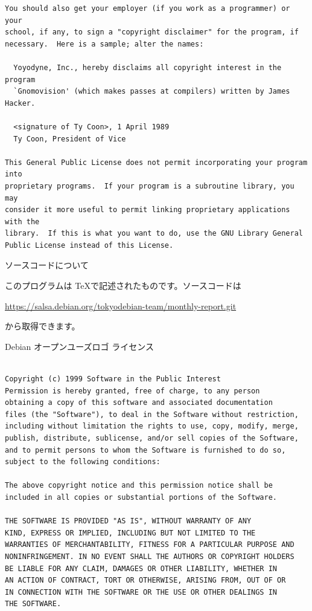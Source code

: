 \documentclass[mingoth,a4paper]{jsarticle}
\begin{document}
\begin{multicols}{2}
\begin{fontsize}{6}{6}
\begin{verbatim}
You should also get your employer (if you work as a programmer) or your
school, if any, to sign a "copyright disclaimer" for the program, if
necessary.  Here is a sample; alter the names:

  Yoyodyne, Inc., hereby disclaims all copyright interest in the program
  `Gnomovision' (which makes passes at compilers) written by James Hacker.

  <signature of Ty Coon>, 1 April 1989
  Ty Coon, President of Vice

This General Public License does not permit incorporating your program into
proprietary programs.  If your program is a subroutine library, you may
consider it more useful to permit linking proprietary applications with the
library.  If this is what you want to do, use the GNU Library General
Public License instead of this License.
 \end{verbatim}
 \end{fontsize}
\end{multicols}

\begin{center}
ソースコードについて
\end{center}

このプログラムは \TeX で記述されたものです。ソースコードは
\begin{center}
  \url{https://salsa.debian.org/tokyodebian-team/monthly-report.git}
\end{center}
から取得できます。

\begin{center}
Debian オープンユーズロゴ ライセンス
\end{center}

\begin{multicols}{2}
 \begin{fontsize}{6}{6}
 \begin{verbatim}

Copyright (c) 1999 Software in the Public Interest
Permission is hereby granted, free of charge, to any person
obtaining a copy of this software and associated documentation
files (the "Software"), to deal in the Software without restriction,
including without limitation the rights to use, copy, modify, merge,
publish, distribute, sublicense, and/or sell copies of the Software,
and to permit persons to whom the Software is furnished to do so,
subject to the following conditions:

The above copyright notice and this permission notice shall be
included in all copies or substantial portions of the Software.

THE SOFTWARE IS PROVIDED "AS IS", WITHOUT WARRANTY OF ANY
KIND, EXPRESS OR IMPLIED, INCLUDING BUT NOT LIMITED TO THE
WARRANTIES OF MERCHANTABILITY, FITNESS FOR A PARTICULAR PURPOSE AND
NONINFRINGEMENT. IN NO EVENT SHALL THE AUTHORS OR COPYRIGHT HOLDERS
BE LIABLE FOR ANY CLAIM, DAMAGES OR OTHER LIABILITY, WHETHER IN
AN ACTION OF CONTRACT, TORT OR OTHERWISE, ARISING FROM, OUT OF OR
IN CONNECTION WITH THE SOFTWARE OR THE USE OR OTHER DEALINGS IN
THE SOFTWARE.
 \end{verbatim}
 \end{fontsize}
\end{multicols}
\end{document}

